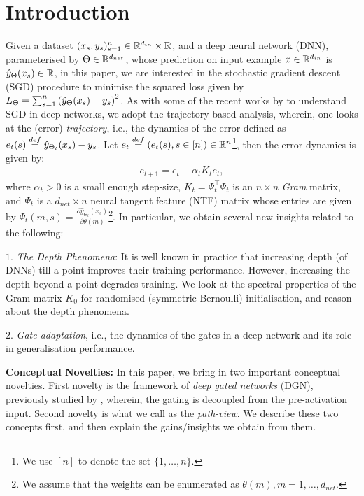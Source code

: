 \section{Introduction}\label{sec:intro}
Given a dataset $(x_s,y_s)_{s=1}^n\in \mathbb{R}^{d_{in}}\times \mathbb{R}$, and a deep neural network (DNN), parameterised by $\Theta\in \mathbb{R}^{d_{net}}$, whose prediction on input example $x\in \mathbb{R}^{d_{in}}$ is $\hat{y}_{\Theta}(x_s)\in \mathbb{R}$, in this paper, we are interested in the stochastic gradient descent (SGD) procedure to minimise the squared loss given by $L_{\Theta}=\sum_{s=1}^n \left(\hat{y}_{{\Theta}}(x_s) - y_s\right)^2$.  
As with some of the recent works by \cite{dudnn,dudln} to understand SGD in deep networks, we adopt the trajectory based analysis, wherein, one looks at the (error) \emph{trajectory}, i.e., the dynamics of the error defined as $e_t(s)\stackrel{def}=\hat{y}_{{\Theta}_t}(x_s)-y_s$. Let $e_t\stackrel{def}=(e_t(s),s\in[n])\in\mathbb{R}^n$\footnote{We use $[n]$ to denote the set $\{1,\ldots,n\}$.}, then the error dynamics is given by:
\begin{align}\label{eq:basictraj}
e_{t+1}=e_t-\alpha_t K_t e_t,
\end{align}
where $\alpha_t>0$ is a small enough step-size, $K_t=\Psi_t^\top\Psi_t$ is an $n\times n$ \emph{Gram} matrix, and $\Psi_t$ is a $d_{net}\times n$ neural tangent feature (NTF) matrix whose entries are given by $\Psi_t(m,s)=\frac{\partial \hat{y}_{\Theta_t}(x_s)}{\partial \theta(m)}$\footnote{We assume that the weights can be enumerated as $\theta(m),m=1,\ldots, d_{net}$.}. In particular, we obtain several new insights related to the following:

$1.$ \emph{The Depth Phenomena}: It is well known in practice that increasing depth (of DNNs) till a point improves their training performance. However, increasing the depth beyond a point degrades training. We look at the spectral properties of the Gram matrix $K_0$ for randomised (symmetric Bernoulli) initialisation, and reason about the depth phenomena.

$2.$ \emph{Gate adaptation}, i.e., the dynamics of the gates in a deep network and its role in generalisation performance.


\textbf{Conceptual Novelties:} In this paper, we bring in two important conceptual novelties. First novelty is the framework of \emph{deep gated networks} (DGN), previously studied by \cite{sss}, wherein, the gating is decoupled from the pre-activation input. 
 Second novelty is what we call as the \emph{path-view}. We describe these two concepts first, and then explain the gains/insights we obtain from them.


